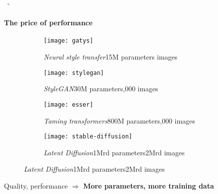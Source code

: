 \documentclass[aspectratio=169, 22pt]{beamer}
\begin{document}
\begin{frame}{\secname~- \subsecname}
  \framesubtitle{The price of performance}
  \begin{figure}
    \begin{subfigure}[t]{0.24\linewidth}\centering
      \texttt{[image: gatys]}
      \caption{{\emph{Neural style transfer}\newline[Gatys et al., 2016]\newline 15M parameters images}}
    \end{subfigure}
    \begin{subfigure}[t]{0.24\linewidth}\centering
      \texttt{[image: stylegan]}                
      \caption{{\emph{StyleGAN}\newline[Karras et al., 2019]\newline 30M parameters,000 images}}
    \end{subfigure}
    \begin{subfigure}[t]{0.24\linewidth}\centering
      \texttt{[image: esser]}                      
      \caption{\emph{Taming transformers}\newline[Esser et al., 2021]\newline 800M parameters,000 images}
    \end{subfigure}
    \begin{subfigure}[t]{0.24\linewidth}\centering
      \texttt{[image: stable-diffusion]}
      \caption{\emph{Latent Diffusion}\newline[Rombach et al., 2022]\newline 1Mrd parameters\newline 2Mrd images}
    \end{subfigure}
  \end{figure}
  \begin{exampleblock}{}
    Quality, performance $\Rightarrow$ \textbf{More \alert{parameters}, more training \alert{data}}
  \end{exampleblock}
\end{frame}
\end{document}
